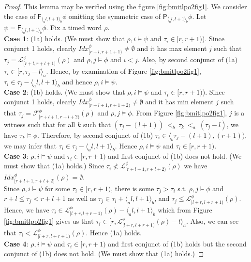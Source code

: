 \documentclass{llncs}
\newcommand{\fut}{\textsf{F}}
\newcommand{\past}{\textsf{P}}
\newcommand{\idx}{\mathit{Idx}}
\newcommand{\frst}{{\mathcal F}}
\newcommand{\lst}{{\mathcal L}}
\begin{document}
\begin{proof}
This lemma may be verified using the figure \ref{fig:bmitlpo2fig1}. We consider the case of $\fut_{\langle_a l, l+1 \rangle_b} \phi$ omitting the symmetric case of $\past_{\langle_a l, l+1 \rangle_b} \phi$. Let $\psi=\fut_{ \langle_a l, l+1 \rangle_b} \phi$.
Fix a timed word $\rho$.\\
\textbf{Case 1}:  (1a) holds. (We must show that $\rho,i \models \psi$ and $\tau_i\in [r,r+1)$). Since conjunct 1 holds, clearly $\idx^\phi_{[r+l,r+1+1)} \not=\emptyset$ and it has max element $j$ such that $\tau_j=\lst^\phi_{[r+l,r+l+1)}(\rho)$ and $\rho,j \models \phi$ and $i<j$. Also, by second conjunct of (1a) $\tau_i \in [r,\tau_j -l \rangle_a$. Hence, by examination of Figure \ref{fig:bmitlpo2fig1}, $\tau_i \in \tau_j - \langle_a l , l+1 \rangle_b$  and hence $\rho,i \models \psi$. \\
\textbf{Case 2}:  (1b) holds. (We must show that $\rho,i \models \psi$ and $\tau_i\in [r,r+1)$). Since conjunct 1 holds, clearly $\idx^\phi_{[r+l+1,r+1+2)} \not=\emptyset$ and it has min element $j$ such that $\tau_j=\frst^\phi_{[r+l+1,r+l+2)}(\rho)$ and $\rho,j \models \phi$. From Figure \ref{fig:bmitlpo2fig1}, $j$ is a witness such that for all $k$ such that $(\tau_j-(l+1)) ~<_b~\tau_k~<_a~(\tau_j-l)$, we have $\tau_k\models\phi$. Therefore, by second conjunct of (1b) $\tau_i \in \langle_b \tau_j -(l+1), (r+1))$, we may infer that $\tau_i \in \tau_j - \langle_a l , l+1 \rangle_b$. Hence $\rho,i \models \psi$ and $\tau_i\in [r,r+1)$.\\
\textbf{Case 3}: $\rho,i \models \psi$ and $\tau_i\in [r,r+1)$ and  first conjunct of (1b) does not hold. (We must show that (1a) holds.) Since $\tau_i \not < \lst^\phi_{[r+l+1,r+l+2)}(\rho)$ we have $\idx^\phi_{[r+l+1,r+l+2)}(\rho)=\emptyset$. \\
Since $\rho,i \models \psi$ for some $\tau_i \in [r,r+1)$, there is some $\tau_j>\tau_i$ s.t. $\rho,j \models \phi$ and $r+l \leq \tau_j < r+l+1$ as well as $\tau_j \in \tau_i + \langle_a l,l+1 \rangle_b$, and 
$\tau_j \leq \lst^\phi_{[l+r,l+r+1)}(\rho)$. Hence, we have $\tau_i \in \lst^\phi_{[l+r,l+r+1)}(\rho) - \langle_a l, l+1 \rangle_b$ which from Figure
\ref{fig:bmitlpo2fig1} gives us that $\tau_i \in [r,\lst^\phi_{[l+r,l+r+1)}(\rho) -l \rangle_a$. Also, we can see that $\tau_i < \lst^\phi_{[l+r,l+r+1)}(\rho)$. Hence (1a) holds.\\
\textbf{Case 4}: $\rho,i \models \psi$ and $\tau_i\in [r,r+1)$ and first conjunct of (1b) holds but the second conjunct of (1b) does not hold. (We must show that (1a) holds.)

\end{proof}
\end{document}

